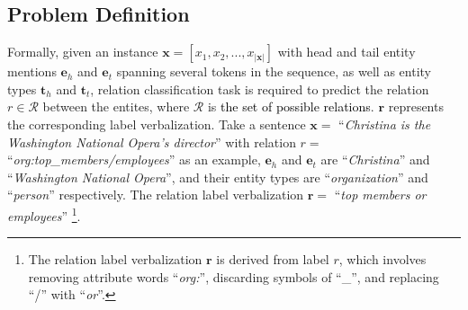 \documentclass[11pt]{article}
\begin{document}
\subsection{Problem Definition}\label{4.1}

Formally, given an instance $\boldsymbol{x}=[x_1, x_2, ..., x_{|\boldsymbol{x}|}]$ with head and tail entity mentions $\boldsymbol{e}_h$ and $\boldsymbol{e}_t$ spanning several tokens in the sequence, as well as entity types $\boldsymbol{t}_h$ and $\boldsymbol{t}_t$, relation classification task is required to predict the relation $r\in\mathcal{R}$ between the entites, where $\mathcal{R}$ is \textcolor{black}{the set of possible relations}. $\boldsymbol{r}$ represents the corresponding label verbalization.
Take a sentence $\boldsymbol{x}=$ ``\textit{Christina is the Washington National Opera's director}'' with relation $r=$ ``\textit{org:top\_members/employees}'' as an example, $\boldsymbol{e}_h$ and $\boldsymbol{e}_t$ are ``\textit{Christina}'' and ``\textit{Washington National Opera}'', and their entity types are ``\textit{organization}'' and ``\textit{person}'' respectively. The relation label verbalization $\boldsymbol{r}=$ ``\textit{top members or employees}'' \footnote{The relation label verbalization $\boldsymbol{r}$ is derived from label $r$, which involves removing attribute words ``\textit{org:}'', discarding symbols of “\_”, and replacing ``/'' with ``\textit{or}''.}. 
\end{document}
